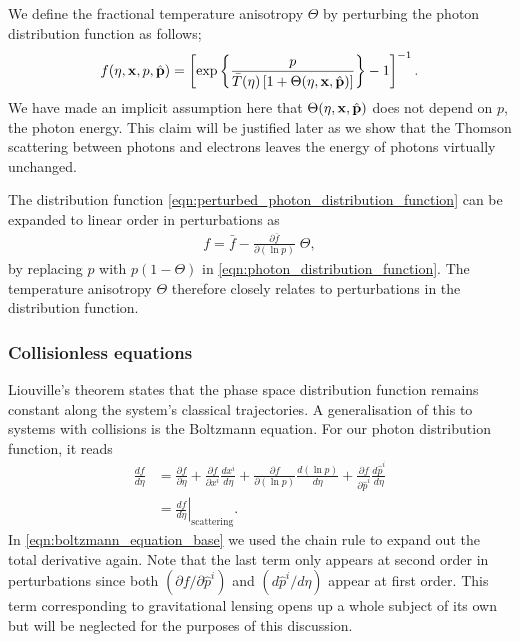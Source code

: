 We define the fractional temperature anisotropy $\Theta$ by perturbing the photon distribution function as follows;
\begin{align}
	f(\eta, \mathbf{x}, p, \hat{\mathbf{p}}) = \left[ \exp \left\{ \frac{p}{\bar{T}(\eta)\left[1 + \Theta (\eta,\mathbf{x},\hat{\mathbf{p}}) \right]} \right\} - 1 \right]^{-1}. \label{eqn:perturbed_photon_distribution_function}
\end{align}
We have made an implicit assumption here that $\Theta(\eta,\mathbf{x},\hat{\mathbf{p}})$ does not depend on $p$, the photon energy. This claim will be justified later as we show that the Thomson scattering between photons and electrons leaves the energy of photons virtually unchanged.

The distribution function \eqref{eqn:perturbed_photon_distribution_function} can be expanded to linear order in perturbations as
\begin{align}
	f = \bar{f} - \frac{\partial \bar{f}}{\partial (\ln p)} \; \Theta,  \label{eqn:perturbed_photon_distribution_function_expansion}
\end{align}
by replacing $p$ with $p(1-\Theta)$ in \eqref{eqn:photon_distribution_function}. The temperature anisotropy $\Theta$ therefore closely relates to perturbations in the distribution function.

\subsubsection*{Collisionless equations} \label{section:collisionless_equation}

Liouville's theorem states that the phase space distribution function remains constant along the system's classical trajectories. A generalisation of this to systems with collisions is the Boltzmann equation. For our photon distribution function, it reads
\begin{align}
	\frac{df}{d\eta} &= \frac{\partial f}{\partial \eta} + \frac{\partial f}{\partial x^i}\frac{dx^i}{d\eta} + \frac{\partial f}{\partial(\ln  p)}\frac{d(\ln p)}{d\eta} + \frac{\partial f}{\partial \hat{p}^i}\frac{d\hat{p}^i}{d\eta} \label{eqn:boltzmann_equation_base}\\
	&= \left. \frac{df}{d\eta} \right|_\text{scattering} . \label{eqn:boltzmann_equation_base_scattering}
\end{align}
In \eqref{eqn:boltzmann_equation_base} we used the chain rule to expand out the total derivative again. Note that the last term only appears at second order in perturbations since both $(\partial f/\partial \hat{p}^i)$ and $(d\hat{p}^i/d\eta)$ appear at first order. This term corresponding to gravitational lensing opens up a whole subject of its own but will be neglected for the purposes of this discussion.

